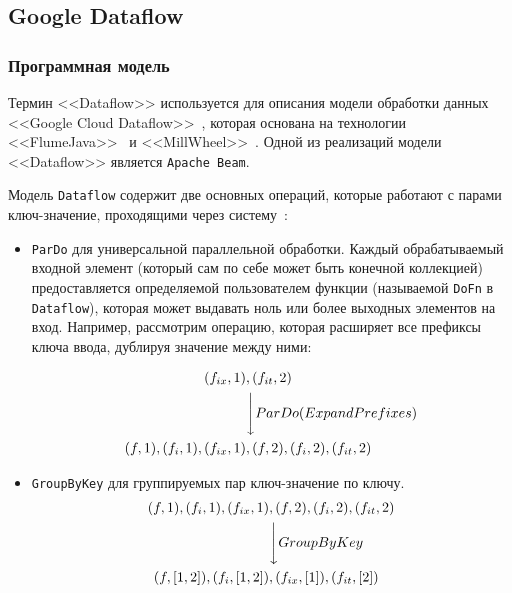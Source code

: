 \subsection{Google Dataflow}

\subsubsection{Программная модель}

Термин <<Dataflow>> используется для описания модели обработки данных <<Google Cloud Dataflow>>~\cite{dataflow}, которая основана на технологии <<FlumeJava>>~\cite{flumejava} и <<MillWheel>>~\cite{millwheel}.
Одной из реализаций модели <<Dataflow>> является \texttt{Apache Beam}.

Модель \texttt{Dataflow} содержит две основных операций, которые работают с парами ключ-значение, проходящими через систему~\cite{dataflow-paper}:

\begin{itemize}
  \item \texttt{ParDo} для универсальной параллельной обработки. 
    Каждый обрабатываемый входной элемент (который сам по себе может быть конечной коллекцией) предоставляется определяемой пользователем функции (называемой \texttt{DoFn} в \texttt{Dataflow}), которая может выдавать ноль или более выходных элементов на вход. 
    Например, рассмотрим операцию, которая расширяет все префиксы ключа ввода, дублируя значение между ними:

    \[
    \begin{split}
      (f_{ix}, 1)&, (f_{it}, 2) \\
      &\Bigg\downarrow ParDo(ExpandPrefixes) \\
      (f, 1), (f_{i}, 1), (f_{ix}, 1)&, (f, 2), (f_{i}, 2), (f_{it}, 2) 
    \end{split}
  \]
  
\item \texttt{GroupByKey} для группируемых пар ключ-значение по ключу.
    \[
    \begin{split}
      (f, 1), (f_{i}, 1), (f_{ix}, 1)&, (f, 2), (f_{i}, 2), (f_{it}, 2) \\
      &\Bigg\downarrow GroupByKey \\
      (f, [1, 2]), (f_{i}, [1, 2])&, (f_{ix}, [1]), (f_{it}, [2]) 
    \end{split}
  \]
\end{itemize}

